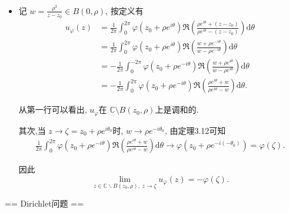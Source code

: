 \begin{itemize}
    \item[3.2.7] 
    记 $w = \frac{\rho^2}{z-z_{0}} \in B(0,\rho)$, 按定义有
    \begin{align*}
        u_\varphi(z) &= \frac{1}{2\pi}\int_{0}^{2\pi}\varphi(z_0+\rho e^{i\theta})
        \Re\left(\frac{\rho e^{i\theta} +(z-z_0)}{\rho e^{i\theta} -(z-z_0)}\right)\mathrm{d}\theta \\
        & =  \frac{1}{2\pi}\int_{0}^{2\pi}\varphi(z_0+\rho e^{i\theta})
        \Re\left(\frac{w+\rho e^{-i\theta} }{w-\rho e^{-i\theta} }\right)\mathrm{d}\theta \\
        & =  -\frac{1}{2\pi}\int_{0}^{-2\pi}\varphi(z_0+\rho e^{-i\theta})
        \Re\left(\frac{w+\rho e^{i\theta} }{w-\rho e^{i\theta} }\right)\mathrm{d}\theta\\
        & = -\frac{1}{2\pi}\int_{0}^{2\pi}\varphi(z_0+\rho e^{-i\theta})
        \Re\left(\frac{\rho e^{i\theta}+w}{\rho e^{i\theta}-w}\right)\mathrm{d}\theta.
    \end{align*}

    从第一行可以看出, $u_\varphi$在 $\mathbb{C}\setminus B(z_0,\rho)$上是调和的. 
    
    其次,当 $z\to \zeta = z_0 + \rho e^{i\theta_0}$时, $w\to \rho e^{-i\theta_0}$, 由定理3.12可知
    \begin{align*}
        \frac{1}{2\pi}\int_{0}^{2\pi}\varphi(z_0+\rho e^{-i\theta})
        \Re\left(\frac{\rho e^{i\theta}+w}{\rho e^{i\theta}-w}\right) \mathrm{d}\theta 
        \to  \varphi(z_0+\rho e^{-i(-\theta_0)}) = \varphi(\zeta).
    \end{align*}

    因此
    $$\lim_{z\in\mathbb{C}\backslash B(z_0,\rho),\ z \to \zeta }u_{\varphi}(z) 
    = -\varphi(\zeta).$$
\end{itemize}

== Dirichlet问题 ==

